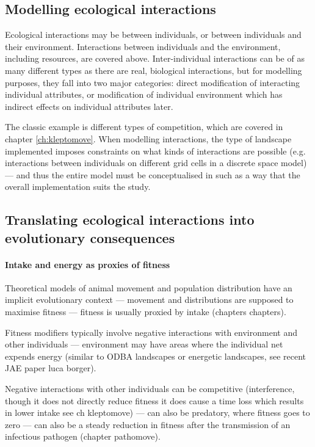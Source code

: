 \subsection*{Modelling ecological interactions}

Ecological interactions may be between individuals, or between individuals and their environment.
Interactions between individuals and the environment, including resources, are covered above.
Inter-individual interactions can be of as many different types as there are real, biological interactions, but for modelling purposes, they fall into two major categories: direct modification of interacting individual attributes, or modification of individual environment which has indirect effects on individual attributes later.

The classic example is different types of competition, which are covered in chapter \ref{ch:kleptomove}.
When modelling interactions, the type of landscape implemented imposes constraints on what kinds of interactions are possible (e.g. interactions between individuals on different grid cells in a discrete space model) --- and thus the entire model must be conceptualised in such as a way that the overall implementation suits the study.

\subsection*{Translating ecological interactions into evolutionary consequences}

\paragraph*{Intake and energy as proxies of fitness} 

Theoretical models of animal movement and population distribution have an implicit evolutionary context --- movement and distributions are supposed to maximise fitness --- fitness is usually proxied by intake (chapters chapters).

Fitness modifiers typically involve negative interactions with environment and other individuals --- environment may have areas where the individual net expends energy (similar to ODBA landscapes or energetic landscapes, see recent JAE paper luca borger).

Negative interactions with other individuals can be competitive (interference, though it does not directly reduce fitness it does cause a time loss which results in lower intake see ch kleptomove) --- can also be predatory, where fitness goes to zero --- can also be a steady reduction in fitness after the transmission of an infectious pathogen (chapter pathomove).

